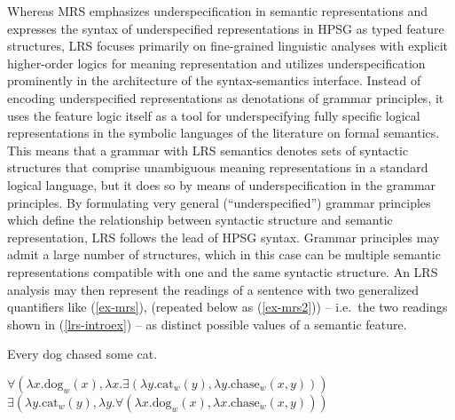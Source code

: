 \documentclass[output=paper]{langsci/langscibook}
\begin{document}
Whereas MRS emphasizes underspecification in semantic representations and expresses the syntax of underspecified representations in HPSG as typed feature structures, LRS focuses primarily on fine-grained linguistic analyses with explicit higher-order logics for meaning representation and utilizes underspecification prominently in the architecture of the syntax-semantics interface. Instead of encoding underspecified representations as denotations of grammar principles, it uses the feature logic itself as a tool for underspecifying fully specific logical representations in the symbolic languages of the literature on formal semantics. This means that a grammar with LRS semantics denotes sets of syntactic structures that comprise unambiguous meaning representations in a standard logical language, but it does so by means of underspecification in the grammar principles. By formulating very general (``underspecified'') grammar principles which define the relationship between syntactic structure and semantic representation, LRS follows the lead of HPSG syntax.
Grammar principles may admit a large number of structures, which in this case can be multiple semantic representations compatible with one and the same syntactic structure. An LRS analysis may then represent the readings of a sentence with two generalized quantifiers like (\ref{ex-mrs}),  (repeated below as (\ref{ex-mrs2})) -- i.e.\ the two readings shown in (\ref{lrs-introex}) -- as distinct possible values of a semantic feature.


\begin{exe}
\ex\label{ex-mrs2}
Every dog chased some cat.
\end{exe}

\begin{exe}
  \ex\label{lrs-introex}
\begin{xlist}
  \ex\label{lrs-introex1a}
  
  $\forall \left(\lambda x.\text{dog}_w(x),\lambda x.\exists \left(\lambda y.\text{cat}_w(y),\lambda y.\text{chase}_w(x,y)\right)\right)$ 
  \ex\label{lrs-introex1b}
  $\exists \left(\lambda y.\text{cat}_w(y),\lambda y.\forall \left(\lambda x.\text{dog}_w(x),\lambda x.\text{chase}_w(x,y)\right)\right)$ 
\end{xlist}
\end{exe}
\end{document}
